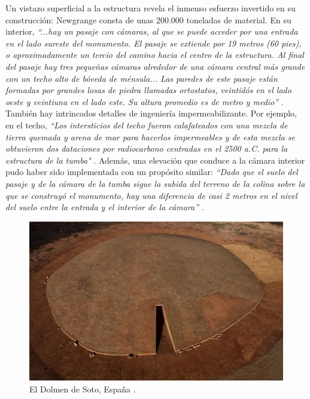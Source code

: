 \documentclass[10pt,twocolumn,letterpaper]{article}
\begin{document}
Un vistazo superficial a la estructura revela el inmenso esfuerzo invertido en su construcción: Newgrange consta de unas 200.000 toneladas de material. En su interior, \textit{“...hay un pasaje con cámaras, al que se puede acceder por una entrada en el lado sureste del monumento. El pasaje se extiende por 19 metros (60 pies), o aproximadamente un tercio del camino hacia el centro de la estructura. Al final del pasaje hay tres pequeñas cámaras alrededor de una cámara central más grande con un techo alto de bóveda de ménsula... Las paredes de este pasaje están formadas por grandes losas de piedra llamadas ortostatos, veintidós en el lado oeste y veintiuna en el lado este. Su altura promedio es de metro y medio”} \cite{70}. También hay intrincados detalles de ingeniería impermeabilizante. Por ejemplo, en el techo, \textit{“Los intersticios del techo fueron calafateados con una mezcla de tierra quemada y arena de mar para hacerlos impermeables y de esta mezcla se obtuvieron dos dataciones por radiocarbono centradas en el 2500 a.C. para la estructura de la tumba"} \cite{71}. Además, una elevación que conduce a la cámara interior pudo haber sido implementada con un propósito similar: \textit{“Dado que el suelo del pasaje y de la cámara de la tumba sigue la subida del terreno de la colina sobre la que se construyó el monumento, hay una diferencia de casi 2 metros en el nivel del suelo entre la entrada y el interior de la cámara”} \cite{71}.

\begin{figure}[t]
\begin{center}
   \includegraphics[width=1\linewidth]{dolmen.jpg}
\end{center}
   \caption{El Dolmen de Soto, España \cite{53}.}
\label{fig:9}
\label{fig:onecol}
\end{figure}
\end{document}
